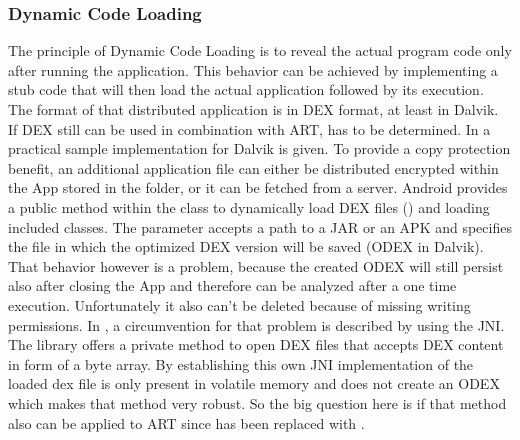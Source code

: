 \subsubsection{Dynamic Code Loading}\label{section:dynamic_code_loading}
The principle of Dynamic Code Loading is to reveal the actual program code
only after running the application. This behavior can be achieved by
implementing a stub code that will then load the actual application
followed by its execution. The format of that distributed application is
in DEX format, at least in Dalvik. If DEX still can be used
in combination with ART, has to be determined.
In \parencite{dexfileclass} a practical
sample implementation for Dalvik is given.
To provide a copy protection benefit, an additional application file can either be distributed encrypted within the App stored in the  folder, or it can be fetched from a server.
Android provides a public method within
the  class to dynamically load DEX files
()
and loading included classes. The  parameter accepts
a path to a JAR or an APK and  specifies
the file in which the optimized DEX version will be saved (ODEX in Dalvik).
That behavior however is a problem, because the created ODEX will still persist
also after closing the App and therefore can be analyzed after a one time
execution. Unfortunately it also can't be deleted because of missing writing permissions. In \parencite{code_protection},
a circumvention for that problem is described by using the JNI.
The  library offers a private method to open DEX files
that accepts DEX content in form of a byte array.
By establishing this own JNI implementation of
 the loaded dex file is only present
in volatile memory and does not create an ODEX \parencite{code_protection}
which makes that method very robust. So the big question here is if
that method also can be applied to ART since  has been replaced
with .

